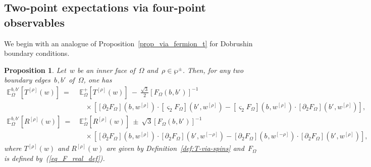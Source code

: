 \documentclass[reqno,11pt,a4paper]{amsart}
\newtheorem{proposition}{Proposition}[section]
\theoremstyle{remark}
\newcommand{\Trho}{T^{[\rho]}}
\newcommand{\Rrho}{R^{[\rho]}}
\newcommand{\dob}{{b,b'}}
\newcommand{\E}{\mathbb{E}_\Omega}
\newcommand{\wrho}{w^{\left[\rho \right]}}
\newcommand{\wmrho}{w^{\left[-\rho \right]}}
\newcommand{\F}{F_\Omega}       \newcommand{\Fdelta}{F_{\Omega_\delta}}
\newcommand{\dTwo}{\partial_2}
\newcommand{\sTwo}{\varsigma_2}
\begin{document}
\subsection{Two-point expectations via four-point observables} \label{sub:TT-via-fermionic}
We begin with an analogue of Proposition~\ref{prop_via_fermion_t} for Dobrushin boundary conditions.

\begin{proposition}
\label{prop_via_fermion_tdob}
Let~$w$ be an inner face of~$\Omega$ and~$\rho\in\wp^\pm$. Then, for any two boundary edges~$b_{},b'_{}$ of~$\Omega$, one has
\begin{align*}
\E^{\dob}[\Trho(w)] ~ =& \ \E^+[\Trho(w)] ~{-}~{\textstyle\frac{\sqrt{3}}{2}}\left[\F(b_{},b'_{})\right]^{-1} \\ & \quad \times\left[[\dTwo\F](b_{},\wrho)\cdot[\sTwo\F](b'_{},\wrho)-[\sTwo\F](b_{},\wrho)\cdot[\dTwo\F](b'_{},\wrho)\right], \\
\E^{\dob}[\Rrho(w)]~=& \ \E^+[\Rrho(w)]~{\pm}~{\sqrt{3}}\left[\F(b_{},b'_{})\right]^{-1}\\ & \quad \times\left[[\dTwo\F](b_{},\wrho)\cdot[\dTwo\F](b'_{},\wmrho)-[\dTwo\F](b_{},\wmrho)\cdot[\dTwo\F](b'_{},\wrho)\right],
\end{align*}
where $\Trho(w)$ and $\Rrho(w)$ are given by Definition~\ref{def:T-via-spins} and~$\F$ is defined by~(\ref{eq_F_real_def}).
\end{proposition}
\end{document}
